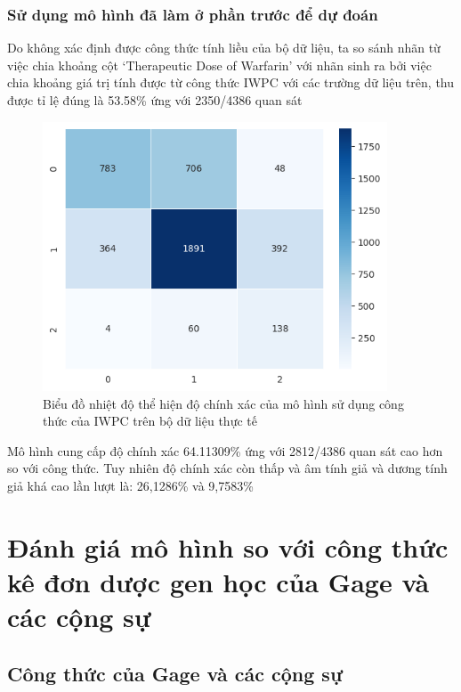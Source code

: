\documentclass[14pt,oneside]{scrbook}
\begin{document}
\subsubsection{Sử dụng mô hình đã làm ở phần trước để dự
đoán}\label{sux1eed-dux1ee5ng-muxf4-huxecnh-ux111uxe3-luxe0m-ux1edf-phux1ea7n-trux1b0ux1edbc-ux111ux1ec3-dux1ef1-ux111ouxe1n}

Do không xác định được công thức tính liều của bộ dữ liệu, ta so sánh
nhãn từ việc chia khoảng cột `Therapeutic Dose of Warfarin' với nhãn
sinh ra bởi việc chia khoảng giá trị tính được từ công thức IWPC với các
trường dữ liệu trên, thu được tỉ lệ đúng là 53.58\% ứng với 2350/4386
quan sát

\begin{figure}
\centering
\includegraphics[width=\textwidth,height=8cm]{image/iwpc_heatmap_real.png}
\caption{Biểu đồ nhiệt độ thể hiện độ chính xác của mô hình sử dụng công
thức của IWPC trên bộ dữ liệu thực tế}
\end{figure}

Mô hình cung cấp độ chính xác 64.11309\% ứng với 2812/4386 quan sát cao
hơn so với công thức. Tuy nhiên độ chính xác còn thấp và âm tính giả và
dương tính giả khá cao lần lượt là: 26,1286\% và 9,7583\%

\section{Đánh giá mô hình so với công thức kê đơn dược gen học của Gage và các cộng sự}\label{sux1eed-dux1ee5ng-cuxf4ng-thux1ee9c-kuxea-ux111ux1a1n-cux1ee7a-gage-vuxe0-cuxe1c-cux1ed9ng-sux1ef1-ux111ux1ec3-ux111uxe1nh-giuxe1-muxf4-huxecnh}

\subsection{Công thức của Gage và các cộng
sự}\label{cuxf4ng-thux1ee9c-cux1ee7a-gage-vuxe0-cuxe1c-cux1ed9ng-sux1ef1}
\end{document}

